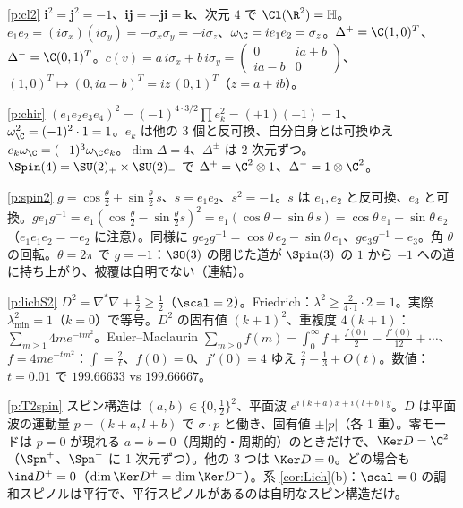 \begin{sol}{\ref{p:cl2}}
$\mathbf i^2=\mathbf j^2=-1$、$\mathbf{ij}=-\mathbf{ji}=\mathbf k$、次元 $4$ で $\Cl(\R^2)=\mathbb H$。$e_1e_2=(i\sigma_x)(i\sigma_y)=-\sigma_x\sigma_y=-i\sigma_z$、$\omega_{\C}=ie_1e_2=\sigma_z$。$\Delta^+=\C(1,0)^T$、$\Delta^-=\C(0,1)^T$。$c(v)=a\,i\sigma_x+b\,i\sigma_y=\begin{pmatrix}0&ia+b\\ia-b&0\end{pmatrix}$、$(1,0)^T\mapsto(0,ia-b)^T=iz\,(0,1)^T$（$z=a+ib$）。
\end{sol}
\begin{sol}{\ref{p:chir}}
$(e_1e_2e_3e_4)^2=(-1)^{4\cdot3/2}\prod e_k^2=(+1)(+1)=1$、$\omega_{\C}^2=(-1)^2\cdot1=1$。$e_k$ は他の 3 個と反可換、自分自身とは可換ゆえ $e_k\omega_{\C}=(-1)^3\omega_{\C}e_k$。$\dim\Delta=4$、$\Delta^\pm$ は $2$ 次元ずつ。$\Spin(4)=\SU(2)_+\times\SU(2)_-$ で $\Delta^+=\C^2\otimes1$、$\Delta^-=1\otimes\C^2$。
\end{sol}
\begin{sol}{\ref{p:spin2}}
$g=\cos\frac\theta2+\sin\frac\theta2\,s$、$s=e_1e_2$、$s^2=-1$。$s$ は $e_1,e_2$ と反可換、$e_3$ と可換。$ge_1g^{-1}=e_1(\cos\frac\theta2-\sin\frac\theta2s)^2=e_1(\cos\theta-\sin\theta\,s)=\cos\theta\,e_1+\sin\theta\,e_2$（$e_1e_1e_2=-e_2$ に注意）。同様に $ge_2g^{-1}=\cos\theta\,e_2-\sin\theta\,e_1$、$ge_3g^{-1}=e_3$。角 $\theta$ の回転。$\theta=2\pi$ で $g=-1$：$\SO(3)$ の閉じた道が $\Spin(3)$ の $1$ から $-1$ への道に持ち上がり、被覆は自明でない（連結）。
\end{sol}
\begin{sol}{\ref{p:lichS2}}
$D^2=\nabla^*\nabla+\frac12\ge\frac12$（$\scal=2$）。Friedrich：$\lambda^2\ge\frac{2}{4\cdot1}\cdot2=1$。実際 $\lambda^2_{\min}=1$（$k=0$）で等号。$D^2$ の固有値 $(k+1)^2$、重複度 $4(k+1)$：$\sum_{m\ge1}4me^{-tm^2}$。Euler--Maclaurin $\sum_{m\ge0}f(m)=\int_0^\infty f+\frac{f(0)}2-\frac{f'(0)}{12}+\cdots$、$f=4me^{-tm^2}$：$\int=\frac2t$、$f(0)=0$、$f'(0)=4$ ゆえ $\frac2t-\frac13+O(t)$。数値：$t=0.01$ で $199.66633$ vs $199.66667$。
\end{sol}
\begin{sol}{\ref{p:T2spin}}
スピン構造は $(a,b)\in\{0,\frac12\}^2$、平面波 $e^{i(k+a)x+i(l+b)y}$。$D$ は平面波の運動量 $p=(k+a,l+b)$ で $\sigma\cdot p$ と働き、固有値 $\pm|p|$（各 1 重）。零モードは $p=0$ が現れる $a=b=0$（周期的・周期的）のときだけで、$\Ker D=\C^2$（$\Spn^+$、$\Spn^-$ に 1 次元ずつ）。他の 3 つは $\Ker D=0$。どの場合も $\ind D^+=0$（$\dim\Ker D^+=\dim\Ker D^-$）。系 \ref{cor:Lich}(b)：$\scal=0$ の調和スピノルは平行で、平行スピノルがあるのは自明なスピン構造だけ。
\end{sol}
